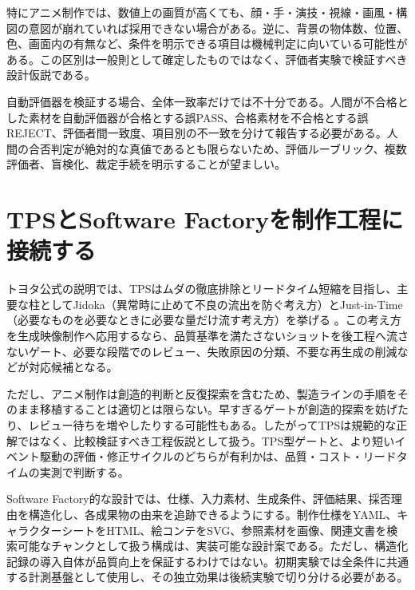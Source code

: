 \documentclass[11pt,a4paper]{article}
\begin{document}
特にアニメ制作では、数値上の画質が高くても、顔・手・演技・視線・画風・構図の意図が崩れていれば採用できない場合がある。逆に、背景の物体数、位置、色、画面内の有無など、条件を明示できる項目は機械判定に向いている可能性がある。この区別は一般則として確定したものではなく、評価者実験で検証すべき設計仮説である。

自動評価器を検証する場合、全体一致率だけでは不十分である。人間が不合格とした素材を自動評価器が合格とする誤PASS、合格素材を不合格とする誤REJECT、評価者間一致度、項目別の不一致を分けて報告する必要がある。人間の合否判定が絶対的な真値であるとも限らないため、評価ルーブリック、複数評価者、盲検化、裁定手続を明示することが望ましい。

\section{TPSとSoftware Factoryを制作工程に接続する}
トヨタ公式の説明では、TPSはムダの徹底排除とリードタイム短縮を目指し、主要な柱としてJidoka（異常時に止めて不良の流出を防ぐ考え方）とJust-in-Time（必要なものを必要なときに必要な量だけ流す考え方）を挙げる \cite{toyotaTPS}。この考え方を生成映像制作へ応用するなら、品質基準を満たさないショットを後工程へ流さないゲート、必要な段階でのレビュー、失敗原因の分類、不要な再生成の削減などが対応候補となる。

ただし、アニメ制作は創造的判断と反復探索を含むため、製造ラインの手順をそのまま移植することは適切とは限らない。早すぎるゲートが創造的探索を妨げたり、レビュー待ちを増やしたりする可能性もある。したがってTPSは規範的な正解ではなく、比較検証すべき工程仮説として扱う。TPS型ゲートと、より短いイベント駆動の評価・修正サイクルのどちらが有利かは、品質・コスト・リードタイムの実測で判断する。

Software Factory的な設計では、仕様、入力素材、生成条件、評価結果、採否理由を構造化し、各成果物の由来を追跡できるようにする。制作仕様をYAML、キャラクターシートをHTML、絵コンテをSVG、参照素材を画像、関連文書を検索可能なチャンクとして扱う構成は、実装可能な設計案である。ただし、構造化記録の導入自体が品質向上を保証するわけではない。初期実験では全条件に共通する計測基盤として使用し、その独立効果は後続実験で切り分ける必要がある。
\end{document}
